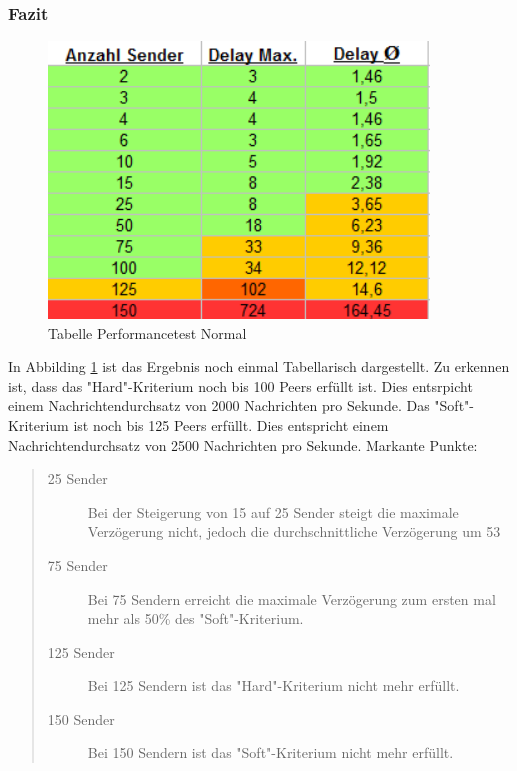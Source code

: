 \subsubsection{Fazit}
\begin{figure}[htH]
\centering
\includegraphics[width=0.9\textwidth]{backend/Tabelle_Performance_Normal.PNG}
\caption{Tabelle Performancetest Normal}
\label{backfig15}
\end{figure}
In Abbilding \ref{backfig15} ist das Ergebnis noch einmal Tabellarisch dargestellt.
Zu erkennen ist, dass das "Hard"-Kriterium noch bis 100 Peers erfüllt ist. Dies entsrpicht einem Nachrichtendurchsatz von 2000 Nachrichten pro Sekunde. Das "Soft"-Kriterium ist noch bis 125 Peers erfüllt. Dies entspricht einem Nachrichtendurchsatz von 2500 Nachrichten pro Sekunde. Markante Punkte:
\begin{quote}
  \begin{description}
  \item[25 Sender]
  Bei der Steigerung von 15 auf 25 Sender steigt die maximale Verzögerung nicht, jedoch die durchschnittliche Verzögerung um 53%

  \item[75 Sender]
  Bei 75 Sendern erreicht die maximale Verzögerung zum ersten mal mehr als 50\% des "Soft"-Kriterium.

  \item[125 Sender]
  Bei 125 Sendern ist das "Hard"-Kriterium nicht mehr erfüllt.

  \item[150 Sender]
  Bei 150 Sendern ist das "Soft"-Kriterium nicht mehr erfüllt.
  \end{description}
\end{quote}

